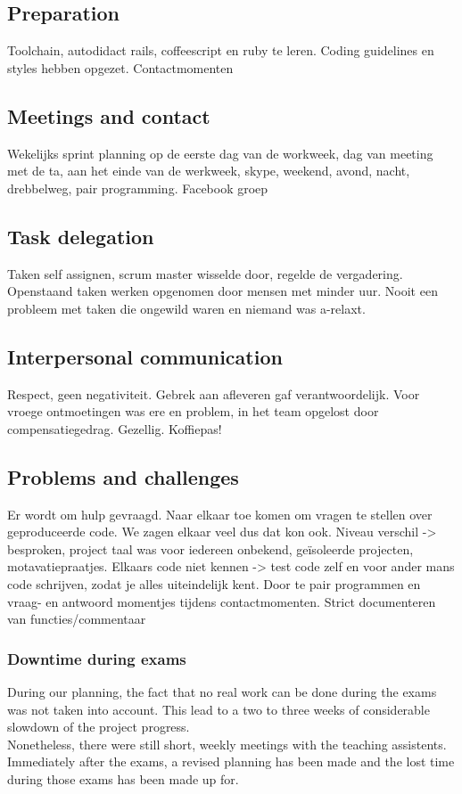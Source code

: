 \documentclass[10pt,a4paper]{report}
\begin{document}
		\subsection{Preparation}
Toolchain, autodidact rails, coffeescript en ruby te leren. Coding guidelines en styles hebben opgezet. 
Contactmomenten
		
		\subsection{Meetings and contact}
Wekelijks sprint planning op de eerste dag van de workweek, dag van meeting met de ta, aan het einde van de werkweek, skype, weekend, avond, nacht, drebbelweg, pair programming. Facebook groep

		\subsection{Task delegation}
Taken self assignen, scrum master wisselde door, regelde de vergadering. Openstaand taken werken opgenomen door mensen met minder uur. Nooit een probleem met taken die ongewild waren en niemand was a-relaxt. 

		\subsection{Interpersonal communication}
Respect, geen negativiteit. Gebrek aan afleveren gaf verantwoordelijk. Voor vroege ontmoetingen was ere en problem, in het team opgelost door compensatiegedrag. Gezellig. Koffiepas! 

		\subsection{Problems and challenges}
Er wordt om hulp gevraagd. Naar elkaar toe komen om vragen te stellen over geproduceerde code. We zagen elkaar veel dus dat kon ook.
	Niveau verschil -> besproken, project taal was voor iedereen onbekend, geïsoleerde projecten, motavatiepraatjes.
Elkaars code niet kennen -> test code zelf en voor ander mans code schrijven, zodat je alles uiteindelijk kent. Door te pair programmen en vraag- en antwoord momentjes tijdens contactmomenten. Strict documenteren van functies/commentaar
			\subsubsection*{Downtime during exams}
				During our planning, the fact that no real work can be done during the exams was not taken into account. This lead to a two to three weeks of considerable slowdown of the project progress.\\
				Nonetheless, there were still short, weekly meetings with the teaching assistents. Immediately after the exams, a revised planning has been made and the lost time during those exams has been made up for.
\end{document}

